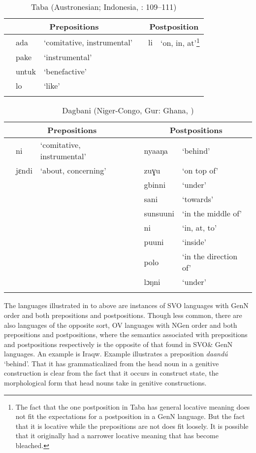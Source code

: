 \documentclass[output=paper]{langsci/langscibook}
\begin{document}
\begin{table}
\caption{Taba (Austronesian; Indonesia, \citealt{Bowden2001}: 109–111)}
\label{extab:dryer:28}
\begin{tabularx}{\textwidth}{lll lll}
\lsptoprule
& \multicolumn{2}{c}{\bfseries Prepositions} &  & \multicolumn{2}{c}{\bfseries Postposition}\\
\midrule
 & ada & ‘comitative, instrumental’ &  & li & ‘on, in, at’\footnote{The fact that the one postposition in Taba has general locative meaning does not fit the expectations for a postposition in a GenN language. But the fact that it is locative while the prepositions are not does fit loosely. It is possible that it originally had a narrower locative meaning that has become bleached.}\\
 & pake & ‘instrumental’ &  &  & \\
 & untuk & ‘benefactive’ &  &  & \\
 & lo & ‘like’ &  &  & \\
\lspbottomrule
\end{tabularx} 
\end{table}

\begin{table}
\caption{Dagbani (Niger-Congo, Gur: Ghana, \citealt{Olawsky1999})}
\label{extab:dryer:29}

\begin{tabularx}{\textwidth}{lll lll} 
\lsptoprule
  & \multicolumn{2}{c}{\bfseries Prepositions} &  & \multicolumn{2}{c}{\bfseries Postpositions}\\
\midrule
 & ni & ‘comitative, instrumental’ &  & nyaaŋa & ‘behind’\\
 & jɛndi & ‘about, concerning’ &  & zuɣu & ‘on top of’\\
 &  &  &  & gbinni & ‘under’\\
 &  &  &  & sani & ‘towards’\\
 &  &  &  & sunsuuni & ‘in the middle of’\\
 &  &  &  & ni & ‘in, at, to’\\
 &  &  &  & puuni & ‘inside’\\
 &  &  &  & polo & ‘in the direction of’\\
 &  &  &  & lɔŋni & ‘under’\\
\lspbottomrule
\end{tabularx}
\end{table}

\clearpage 
The languages illustrated in  to 
above are instances of SVO languages with GenN order and both prepositions and postpositions. Though less common, there are also languages of the opposite sort, OV languages with NGen order and both prepositions and postpositions, where the semantics associated with prepositions and postpositions respectively is the opposite of that found in SVO\& GenN languages. An example is Iraqw. Example  illustrates a preposition \textit{daandú} ‘behind’. That it has grammaticalized from the head noun in a genitive construction is clear from the fact that it occurs in construct state, the morphological form that head nouns take in genitive constructions.
\end{document}
